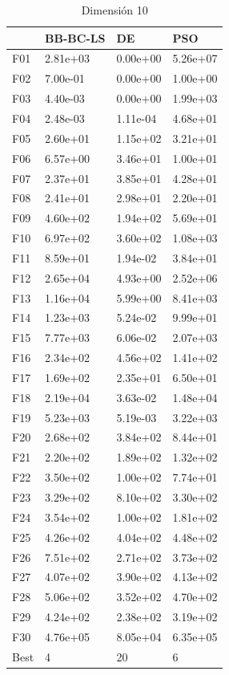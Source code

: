\begin{table}[H]
    \begin{minipage}{.5\linewidth}
      \caption{Dimensión 10}
      \centering
      \begin{tabular}{llll}
        \toprule
        {} &  BB-BC-LS &        DE &       PSO \\
        \midrule
        F01  &  2.81e+03 &  0.00e+00 &  5.26e+07 \\
        F02  &  7.00e-01 &  0.00e+00 &  1.00e+00 \\
        F03  &  4.40e-03 &  0.00e+00 &  1.99e+03 \\
        F04  &  2.48e-03 &  1.11e-04 &  4.68e+01 \\
        F05  &  2.60e+01 &  1.15e+02 &  3.21e+01 \\
        F06  &  6.57e+00 &  3.46e+01 &  1.00e+01 \\
        F07  &  2.37e+01 &  3.85e+01 &  4.28e+01 \\
        F08  &  2.41e+01 &  2.98e+01 &  2.20e+01 \\
        F09  &  4.60e+02 &  1.94e+02 &  5.69e+01 \\
        F10  &  6.97e+02 &  3.60e+02 &  1.08e+03 \\
        F11  &  8.59e+01 &  1.94e-02 &  3.84e+01 \\
        F12  &  2.65e+04 &  4.93e+00 &  2.52e+06 \\
        F13  &  1.16e+04 &  5.99e+00 &  8.41e+03 \\
        F14  &  1.23e+03 &  5.24e-02 &  9.99e+01 \\
        F15  &  7.77e+03 &  6.06e-02 &  2.07e+03 \\
        F16  &  2.34e+02 &  4.56e+02 &  1.41e+02 \\
        F17  &  1.69e+02 &  2.35e+01 &  6.50e+01 \\
        F18  &  2.19e+04 &  3.63e-02 &  1.48e+04 \\
        F19  &  5.23e+03 &  5.19e-03 &  3.22e+03 \\
        F20  &  2.68e+02 &  3.84e+02 &  8.44e+01 \\
        F21  &  2.20e+02 &  1.89e+02 &  1.32e+02 \\
        F22  &  3.50e+02 &  1.00e+02 &  7.74e+01 \\
        F23  &  3.29e+02 &  8.10e+02 &  3.30e+02 \\
        F24  &  3.54e+02 &  1.00e+02 &  1.81e+02 \\
        F25  &  4.26e+02 &  4.04e+02 &  4.48e+02 \\
        F26  &  7.51e+02 &  2.71e+02 &  3.73e+02 \\
        F27  &  4.07e+02 &  3.90e+02 &  4.13e+02 \\
        F28  &  5.06e+02 &  3.52e+02 &  4.70e+02 \\
        F29  &  4.24e+02 &  2.38e+02 &  3.19e+02 \\
        F30  &  4.76e+05 &  8.05e+04 &  6.35e+05 \\
        Best &         4 &        20 &         6 \\
        \bottomrule
        \end{tabular}
        

\end{minipage}
\end{table}
